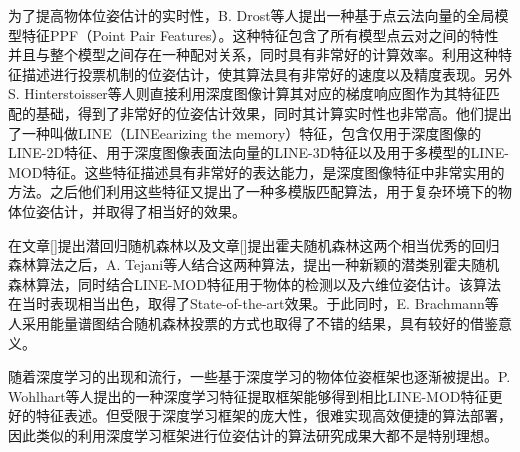 为了提高物体位姿估计的实时性，B. Drost等人提出一种基于点云法向量的全局模型特征PPF（Point Pair Features）。这种特征包含了所有模型点云对之间的特性并且与整个模型之间存在一种配对关系，同时具有非常好的计算效率\cite{drost2010model}。利用这种特征描述进行投票机制的位姿估计，使其算法具有非常好的速度以及精度表现。另外S. Hinterstoisser等人则直接利用深度图像计算其对应的梯度响应图作为其特征匹配的基础，得到了非常好的位姿估计效果，同时其计算实时性也非常高\cite{hinterstoisser2012gradient}。他们提出了一种叫做LINE（LINEearizing the memory）特征，包含仅用于深度图像的LINE-2D特征、用于深度图像表面法向量的LINE-3D特征以及用于多模型的LINE-MOD特征。这些特征描述具有非常好的表达能力，是深度图像特征中非常实用的方法。之后他们利用这些特征又提出了一种多模版匹配算法，用于复杂环境下的物体位姿估计，并取得了相当好的效果\cite{hinterstoisser2011multimodal}。

在文章[]提出潜回归随机森林以及文章[]提出霍夫随机森林这两个相当优秀的回归森林算法之后，A. Tejani等人结合这两种算法，提出一种新颖的潜类别霍夫随机森林算法，同时结合LINE-MOD特征用于物体的检测以及六维位姿估计\cite{tejani2014latent}。该算法在当时表现相当出色，取得了State-of-the-art效果。于此同时，E. Brachmann等人采用能量谱图结合随机森林投票的方式也取得了不错的结果，具有较好的借鉴意义\cite{brachmann2014learning}。

随着深度学习的出现和流行，一些基于深度学习的物体位姿框架也逐渐被提出。P. Wohlhart等人提出的一种深度学习特征提取框架能够得到相比LINE-MOD特征更好的特征表述\cite{wohlhart2015learning}。但受限于深度学习框架的庞大性，很难实现高效便捷的算法部署，因此类似的利用深度学习框架进行位姿估计的算法研究成果大都不是特别理想。

